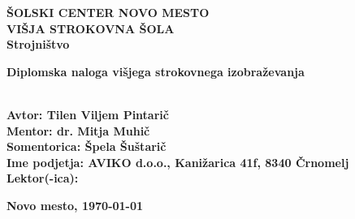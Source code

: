 \begin{titlepage}
	\begin{center}
		\textbf{\fontsize{20}{40}\selectfont
			ŠOLSKI CENTER NOVO MESTO\\
			VIŠJA STROKOVNA ŠOLA\\
			Strojništvo\\
		}
		
		\vspace*{4cm}
		\textbf{\fontsize{18}{27}\selectfont
			Diplomska naloga višjega strokovnega izobraževanja\\
			\fontsize{26}{39}\selectfont \MakeUppercase{\thetitle}\\
		}
		
	\end{center}
	
	\vfill
	
	\textbf{\fontsize{14}{21}\selectfont
		Avtor: Tilen Viljem Pintarič \\
		Mentor: dr. Mitja Muhič \\
		Somentorica: Špela Šuštarič \\
		Ime podjetja: AVIKO d.o.o., Kanižarica 41f, 8340 Črnomelj \\
		Lektor(-ica):
	}
	
	\textbf{\fontsize{14}{21}\selectfont
		\hfill
		Novo mesto,
		\monthyeardate\today
	}
\end{titlepage}